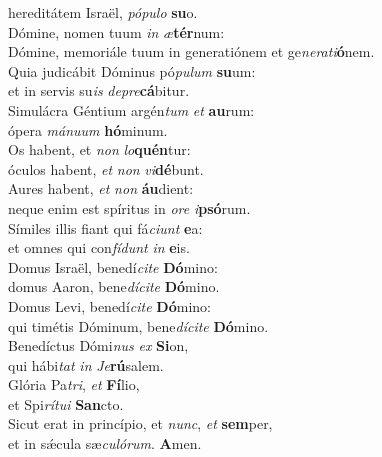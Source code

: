 \evenverse hereditátem Israël, \textit{pó}\textit{pu}\textit{lo} \textbf{su}o.\\
\oddverse Dómine, nomen tuum \textit{in} \textit{æ}\textbf{tér}num:~\*\\
\oddverse Dómine, memoriále tuum in generatiónem et ge\textit{ne}\textit{ra}\textit{ti}\textbf{ó}nem.\\
\evenverse Quia judicábit Dóminus pó\textit{pu}\textit{lum} \textbf{su}um:~\*\\
\evenverse et in servis su\textit{is} \textit{de}\textit{pre}\textbf{cá}bitur.\\
\oddverse Simulácra Géntium argén\textit{tum} \textit{et} \textbf{au}rum:~\*\\
\oddverse ópera \textit{má}\textit{nu}\textit{um} \textbf{hó}minum.\\
\evenverse Os habent, et \textit{non} \textit{lo}\textbf{quén}tur:~\*\\
\evenverse óculos habent, \textit{et} \textit{non} \textit{vi}\textbf{dé}bunt.\\
\oddverse Aures habent, \textit{et} \textit{non} \textbf{áu}dient:~\*\\
\oddverse neque enim est spíritus in \textit{o}\textit{re} \textit{i}\textbf{psó}rum.\\
\evenverse Símiles illis fiant qui fá\textit{ci}\textit{unt} \textbf{e}a:~\*\\
\evenverse et omnes qui con\textit{fí}\textit{dunt} \textit{in} \textbf{e}is.\\
\oddverse Domus Israël, benedí\textit{ci}\textit{te} \textbf{Dó}mino:~\*\\
\oddverse domus Aaron, bene\textit{dí}\textit{ci}\textit{te} \textbf{Dó}mino.\\
\evenverse Domus Levi, benedí\textit{ci}\textit{te} \textbf{Dó}mino:~\*\\
\evenverse qui timétis Dóminum, bene\textit{dí}\textit{ci}\textit{te} \textbf{Dó}mino.\\
\oddverse Benedíctus Dómi\textit{nus} \textit{ex} \textbf{Si}on,~\*\\
\oddverse qui hábi\textit{tat} \textit{in} \textit{Je}\textbf{rú}salem.\\
\evenverse Glória Pa\textit{tri}, \textit{et} \textbf{Fí}lio,~\*\\
\evenverse et Spi\textit{rí}\textit{tu}\textit{i} \textbf{San}cto.\\
\oddverse Sicut erat in princípio, et \textit{nunc}, \textit{et} \textbf{sem}per,~\*\\
\oddverse et in sǽcula sæ\textit{cu}\textit{ló}\textit{rum}. \textbf{A}men.\\
